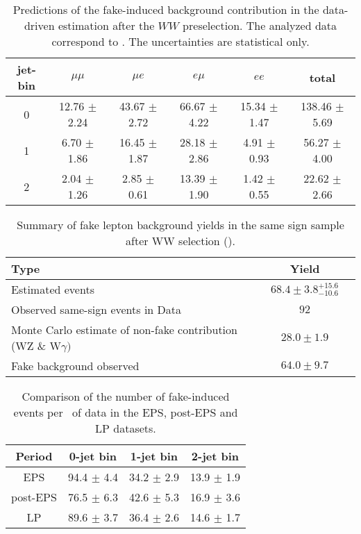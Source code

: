 \begin{table}[!htbp]
\begin{center}
\begin{tabular}{c c c c c c} 
\hline
jet-bin &	 $\mu\mu$ &	 $\mu e$ &	 $e\mu$ &	 $ee$ &	 total \\ 
\hline
0 &	 12.76 $\pm$ 2.24 &	 43.67 $\pm$ 2.72 &	 66.67 $\pm$ 4.22 &	 15.34 $\pm$ 1.47 &	 138.46 $\pm$ 5.69 \\
1 &	 6.70 $\pm$ 1.86  &      16.45 $\pm$ 1.87 &      28.18 $\pm$ 2.86 &       4.91 $\pm$ 0.93 &       56.27 $\pm$ 4.00 \\
2 &	 2.04 $\pm$ 1.26  &       2.85 $\pm$ 0.61 &      13.39 $\pm$ 1.90 &       1.42 $\pm$ 0.55 &       22.62 $\pm$ 2.66 \\
\hline
\end{tabular}
\caption{Predictions of the fake-induced background contribution 
in the data-driven estimation after the $WW$ preselection. 
The analyzed data correspond to \lpintlumi.
The uncertainties are statistical only.}
\label{tab:lp_fake_est}
\end{center}
\end{table}

\begin{table}[!htbp]
\begin{center}
\begin{tabular}{|l|c|c|}
\hline
Type                                                             & Yield \\
\hline
Estimated events                                                 &  $68.4\pm3.8^{+15.6}_{-10.6}$  \\
\hline
Observed same-sign events in Data                                &  $92$        \\
Monte Carlo estimate of non-fake contribution (WZ \& W$\gamma)$  & $28.0\pm1.9$ \\
Fake background observed                                         & $64.0\pm9.7$ \\
\hline
\end{tabular}
\caption{Summary of fake lepton background yields in the same sign sample after WW selection (\lpintlumi). }
\label{tab:lp_FakeLeptonBkgPrediction_SameSignSample}
\end{center}
\end{table}

\begin{table}[!htbp]
\begin{center}
\begin{tabular}{c c c c}
\hline
Period & 0-jet bin & 1-jet bin & 2-jet bin \\
\hline
EPS      & 94.4 $\pm$ 4.4 & 34.2 $\pm$ 2.9 & 13.9 $\pm$ 1.9 \\
post-EPS & 76.5 $\pm$ 6.3 & 42.6 $\pm$ 5.3 & 16.9 $\pm$ 3.6 \\
LP       & 89.6 $\pm$ 3.7 & 36.4 $\pm$ 2.6 & 14.6 $\pm$ 1.7 \\
\hline
\end{tabular}
\caption{Comparison of the number of fake-induced events per \ifb~of data in the EPS, post-EPS and LP datasets.}
\label{tab:lp_periods_fake}
\end{center}
\end{table}

